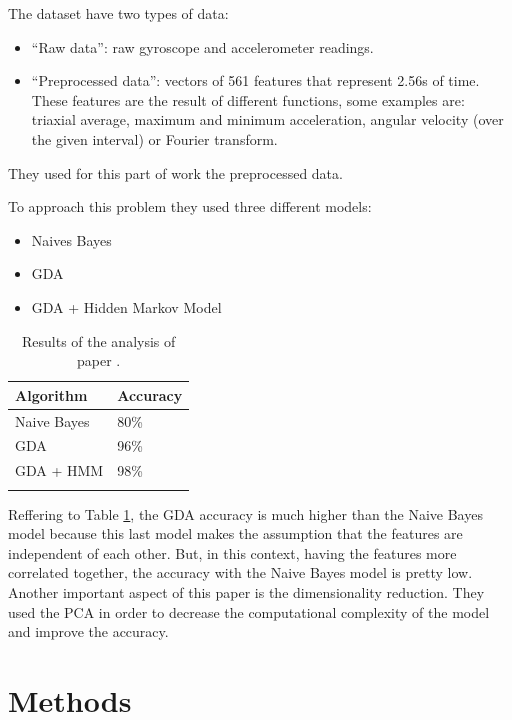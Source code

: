 \documentclass[a4paper,10pt,oneside]{article}
\begin{document}
\noindent The dataset have two types of data:
\begin{itemize}
 \item “Raw data”: raw gyroscope and accelerometer readings.
 \item “Preprocessed data”: vectors of  561 features that represent 2.56s of time. These features are the result of different functions, some examples are: triaxial average, maximum and minimum acceleration, angular velocity (over the given interval) or Fourier transform.
\end{itemize}

\noindent They used for this part of work the preprocessed data.

\noindent To approach this problem they used three different models:
\begin{itemize}
 \item Naives Bayes
 \item GDA
 \item GDA + Hidden Markov Model
\end{itemize}

\begin{table}[ht]
\centering
\begin{tabular}{p{} p{}} 
\toprule
\textbf{Algorithm} & \textbf{Accuracy}\\[5pt]
\midrule
Naive Bayes & 80\% \\[5pt]
GDA & 96\% \\[5pt]
GDA + HMM & 98\%\\[5pt]
\bottomrule\\[5pt]
\end{tabular} 
\caption{Results of the analysis of paper \cite{brown2013activity}.}
\label{tab:paper}
\end{table}

\noindent Reffering to Table \ref{tab:paper}, the GDA accuracy is much higher than the Naive Bayes model because this last model makes the assumption that the features are independent of each other. But, in this context, having the features more correlated together, the accuracy with the Naive Bayes model is pretty low.
Another important aspect of this paper is the dimensionality reduction. They used the PCA in order to decrease the computational complexity of the model and improve the accuracy.


\section{Methods}
\end{document}
